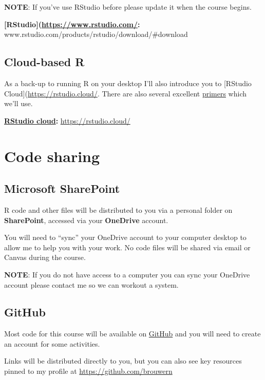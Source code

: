 \documentclass[
]{book}
\begin{document}
\textbf{NOTE}: If you've use RStudio before please update it when the course begins.

\textbf{{[}RStudio{]}(\url{https://www.rstudio.com/}:} www.rstudio.com/products/rstudio/download/\#download

\hypertarget{cloud-based-r}{%
\subsection{Cloud-based R}\label{cloud-based-r}}

As a back-up to running R on your desktop I'll also introduce you to {[}RStudio Cloud{]}(\url{https://rstudio.cloud/}. There are also several excellent \href{https://rstudio.cloud/learn/primers}{primers} which we'll use.

\textbf{\href{https://rstudio.cloud/}{RStudio cloud}:} \url{https://rstudio.cloud/}

\hypertarget{code-sharing}{%
\section{Code sharing}\label{code-sharing}}

\hypertarget{microsoft-sharepoint-1}{%
\subsection{Microsoft SharePoint}\label{microsoft-sharepoint-1}}

R code and other files will be distributed to you via a personal folder on \textbf{SharePoint}, accessed via your \textbf{OneDrive} account.

You will need to ``sync'' your OneDrive account to your computer desktop to allow me to help you with your work. No code files will be shared via email or Canvas during the course.

\textbf{NOTE}: If you do not have access to a computer you can sync your OneDrive account please contact me so we can workout a system.

\hypertarget{github}{%
\subsection{GitHub}\label{github}}

Most code for this course will be available on \href{https://github.com/}{GitHub} and you will need to create an account for some activities.

Links will be distributed directly to you, but you can also see key resources pinned to my profile at \url{https://github.com/brouwern}
\end{document}
